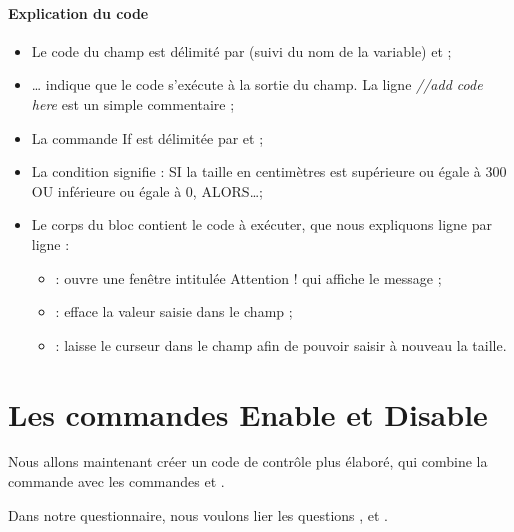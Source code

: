 \paragraph{Explication du code}

\begin{itemize}
	\item Le code du champ est délimité par  (suivi du nom de la variable) et  ;
	\item {} \ldots{}  indique que le code s'exécute à la sortie du champ. La ligne \textit{//add code here} est un simple commentaire ;
	\item La commande If est délimitée par  et  ;
	\item La condition  signifie : SI la taille en centimètres est supérieure ou égale à 300 OU inférieure ou égale à 0, ALORS\ldots ;
	\item Le corps du bloc contient le code à exécuter, que nous expliquons ligne par ligne :
		\begin{itemize}[label=]
			\item {} : ouvre une fenêtre intitulée \og Attention ! \fg{} qui affiche le message  ;
			\item {} : efface la valeur saisie dans le champ  ;
			\item {} : laisse le curseur dans le champ  afin de pouvoir saisir à nouveau la taille.
		\end{itemize}
\end{itemize}

\section{Les commandes Enable et Disable}

Nous allons maintenant créer un code de contrôle plus élaboré, qui combine la commande  avec les commandes  et .

Dans notre questionnaire, nous voulons lier les questions ,  et .

